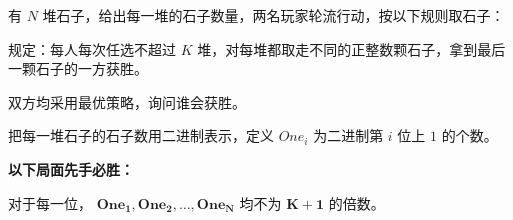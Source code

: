 有 $N$ 堆石子，给出每一堆的石子数量，两名玩家轮流行动，按以下规则取石子：

规定：每人每次任选不超过 $K$ 堆，对每堆都取走不同的正整数颗石子，拿到最后一颗石子的一方获胜。

双方均采用最优策略，询问谁会获胜。

把每一堆石子的石子数用二进制表示，定义 $One_i$ 为二进制第 $i$ 位上 $1$ 的个数。

\textbf{以下局面先手必胜：}

对于每一位， $\pmb{One_1,One_2,\dots ,One_N}$ 均不为 $\pmb{K+1}$ 的倍数。
